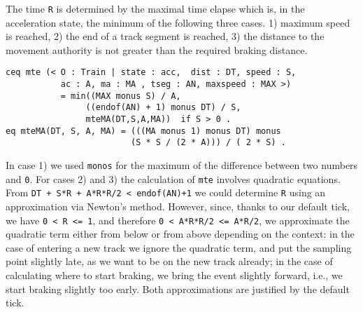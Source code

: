 The time \verb|R| is determined by the maximal time elapse which is,
in the acceleration state, the minimum of the following three
cases. 1) maximum speed is reached, 2) the end of a track segment is
reached, 3) the distance to the movement authority is not greater than
the required braking distance.
\begin{lstlisting}
ceq mte (< O : Train | state : acc,  dist : DT, speed : S, 
           ac : A, ma : MA , tseg : AN, maxspeed : MAX >)
           = min((MAX monus S) / A,
                ((endof(AN) + 1) monus DT) / S,
                mteMA(DT,S,A,MA))  if S > 0 .
eq mteMA(DT, S, A, MA) = (((MA monus 1) monus DT) monus 
                         (S * S / (2 * A))) / ( 2 * S) .
\end{lstlisting}
In case 1) we used \texttt{monos} for the maximum of the difference between two numbers and \texttt{0}. 
For cases 2) and 3) the calculation of \texttt{mte} involves quadratic
equations.  From \texttt{DT + S*R + A*R*R/2 < endof(AN)+1} we
could determine \texttt{R} using an approximation via Newton's
method. However, since, thanks to our default tick, we have \texttt{0 < R <= 1},
and therefore \texttt{0 < A*R*R/2 <= A*R/2},
we approximate the quadratic term either from below or from
above depending on the context: in the case of entering a new track we
ignore the quadratic term, and put the sampling point slightly late,
as we want to be on the new track already; in the case of calculating
where to start braking, we bring the event slightly forward,
i.e., we start braking slightly too early.
Both approximations are justified by the default tick.





